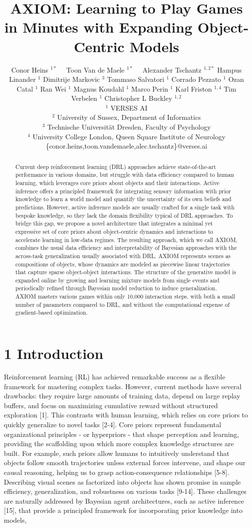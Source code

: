 \documentclass[10pt]{article}
\title{AXIOM: Learning to Play Games in Minutes with Expanding Object-Centric Models }
\author{Conor Heins ${ }^{1 *} \quad$ Toon Van de Maele ${ }^{1 *} \quad$ Alexander Tschantz ${ }^{1,2 *}$ Hampus Linander ${ }^{1}$ Dimitrije Markovic ${ }^{3}$ Tommaso Salvatori ${ }^{1}$ Corrado Pezzato ${ }^{1}$ Ozan Catal ${ }^{1}$ Ran Wei ${ }^{1}$ Magnus Koudahl ${ }^{1}$ Marco Perin ${ }^{1}$ Karl Friston ${ }^{1,4}$ Tim Verbelen ${ }^{1}$ Christopher L Buckley ${ }^{1,2}$\\
${ }^{1}$ VERSES AI\\
${ }^{2}$ University of Sussex, Department of Informatics\\
${ }^{3}$ Technische Universität Dresden, Faculty of Psychology\\
${ }^{4}$ University College London, Queen Square Institute of Neurology\\
\{conor.heins,toon.vandemaele,alec.tschantz\}@verses.ai}
\date{}
\begin{document}
\maketitle
\captionsetup{singlelinecheck=false}


\begin{abstract}
Current deep reinforcement learning (DRL) approaches achieve state-of-the-art performance in various domains, but struggle with data efficiency compared to human learning, which leverages core priors about objects and their interactions. Active inference offers a principled framework for integrating sensory information with prior knowledge to learn a world model and quantify the uncertainty of its own beliefs and predictions. However, active inference models are usually crafted for a single task with bespoke knowledge, so they lack the domain flexibility typical of DRL approaches. To bridge this gap, we propose a novel architecture that integrates a minimal yet expressive set of core priors about object-centric dynamics and interactions to accelerate learning in low-data regimes. The resulting approach, which we call AXIOM, combines the usual data efficiency and interpretability of Bayesian approaches with the across-task generalization usually associated with DRL. AXIOM represents scenes as compositions of objects, whose dynamics are modeled as piecewise linear trajectories that capture sparse object-object interactions. The structure of the generative model is expanded online by growing and learning mixture models from single events and periodically refined through Bayesian model reduction to induce generalization. AXIOM masters various games within only 10,000 interaction steps, with both a small number of parameters compared to DRL, and without the computational expense of gradient-based optimization.
\end{abstract}

\section*{1 Introduction}
Reinforcement learning (RL) has achieved remarkable success as a flexible framework for mastering complex tasks. However, current methods have several drawbacks: they require large amounts of training data, depend on large replay buffers, and focus on maximizing cumulative reward without structured exploration [1]. This contrasts with human learning, which relies on core priors to quickly generalize to novel tasks [2-4]. Core priors represent fundamental organizational principles - or hyperpriors - that shape perception and learning, providing the scaffolding upon which more complex knowledge structures are built. For example, such priors allow humans to intuitively understand that objects follow smooth trajectories unless external forces intervene, and shape our causal reasoning, helping us to grasp action-consequence relationships [5-8]. Describing visual scenes as factorized into objects has shown promise in sample efficiency, generalization, and robustness on various tasks [9-14]. These challenges are naturally addressed by Bayesian agent architectures, such as active inference [15], that provide a principled framework for incorporating prior knowledge into models,
\end{document}
